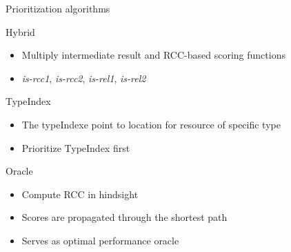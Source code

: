\begin{frame}{Prioritization algorithms}
  \begin{block}{Hybrid}
        \begin{itemize}
        \item Multiply intermediate result and RCC-based scoring functions
        \item \emph{is-rcc1}, \emph{is-rcc2}, \emph{is-rel1}, \emph{is-rel2} 
    \end{itemize}
  \end{block}
  \begin{block}{TypeIndex}
        \begin{itemize}
        \item The typeIndexe point to location for resource of specific type
        \item Prioritize TypeIndex first
    \end{itemize}
  \end{block}
  \begin{block}{Oracle}
        \begin{itemize}
        \item Compute RCC in hindsight
        \item Scores are propagated through the shortest path
        \item Serves as optimal performance oracle
    \end{itemize}
  \end{block}

\end{frame}
